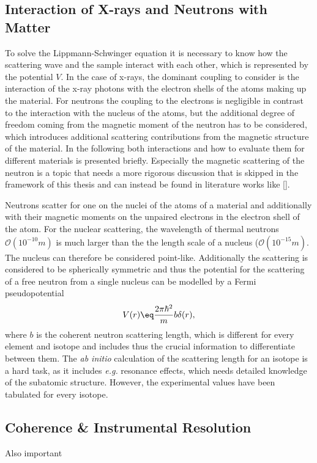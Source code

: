 \documentclass[\main/dresen_thesis.tex]{subfiles}
\begin{document}
\subsection{Interaction of X-rays and Neutrons with Matter}\label{sec:theoreticalBackground:scattering:interactionWithMatter}
To solve the Lippmann-Schwinger equation it is necessary to know how the scattering wave and the sample interact with each other, which is represented by the potential $V$.
In the case of x-rays, the dominant coupling to consider is the interaction of the x-ray photons with the electron shells of the atoms making up the material.
For neutrons the coupling to the electrons is negligible in contrast to the interaction with the nucleus of the atoms, but the additional degree of freedom coming from the magnetic moment of the neutron has to be considered, which introduces additional scattering contributions from the magnetic structure of the material.
In the following both interactions and how to evaluate them for different materials is presented briefly. 
Especially the magnetic scattering of the neutron is a topic that needs a more rigorous discussion that is skipped in the framework of this thesis and can instead be found in literature works like [].%

Neutrons scatter for one on the nuclei of the atoms of a material and additionally with their magnetic moments on the unpaired electrons in the electron shell of the atom. For the nuclear scattering, the wavelength of thermal neutrons $\mathcal{O} (10^{-10} \unit{m})$ is much larger than the the length scale of a nucleus ($\mathcal{O} (10^{-15} \unit{m})$. The nucleus can therefore be considered point-like. Additionally the scattering is considered to be spherically symmetric and thus the potential for the scattering of a free neutron from a single nucleus can be modelled by a Fermi pseudopotential
\begin{align}
  V(r) \eq \frac{2 \pi \hbar^2}{m} b \delta(r),
\end{align}
where $b$ is the coherent neutron scattering length, which is different for every element and isotope and includes thus the crucial information to differentiate between them. The \textit{ab initio} calculation of the scattering length for an isotope is a hard task, as it includes \textit{e.g.} resonance effects, which needs detailed knowledge of the subatomic structure. However, the experimental values have been tabulated for every isotope.

\subsection{Coherence \& Instrumental Resolution}\label{sec:theoreticalBackground:scattering:CoherenceInstrumentalResolution}
Also important
\end{document}
